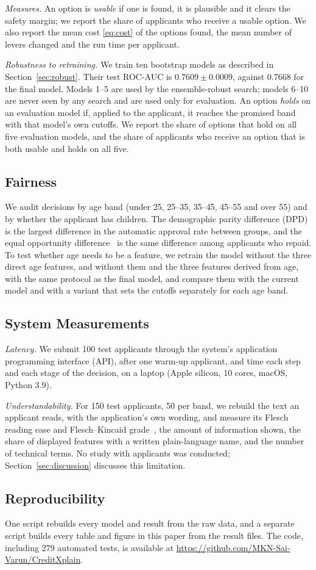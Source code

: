 \emph{Measures.} An option is \emph{usable} if one is found, it is plausible and it clears the safety margin; we report
the share of applicants who receive a usable option. We also report the mean cost \eqref{eq:cost} of the options found,
the mean number of levers changed and the run time per applicant.

\emph{Robustness to retraining.} We train ten bootstrap models as described in Section~\ref{sec:robust}. Their test
ROC-AUC is $0.7609 \pm 0.0009$, against 0.7668 for the final model. Models 1--5 are used by the ensemble-robust search;
models 6--10 are never seen by any search and are used only for evaluation. An option \emph{holds} on an evaluation
model if, applied to the applicant, it reaches the promised band with that model's own cutoffs. We report the share of
options that hold on all five evaluation models, and the share of applicants who receive an option that is both usable
and holds on all five.

\subsection{Fairness}
We audit decisions by age band (under 25, 25--35, 35--45, 45--55 and over 55) and by whether the applicant has
children. The demographic parity difference (DPD) is the largest difference in the automatic approval rate between groups,
and the equal opportunity difference~\cite{hardt2016equality} is the same difference among applicants who repaid. To
test whether age needs to be a feature, we retrain the model without the three direct age features, and without them
and the three features derived from age, with the same protocol as the final model, and compare them with the current
model and with a variant that sets the cutoffs separately for each age band.

\subsection{System Measurements}
\emph{Latency.} We submit 100 test applicants through the system's application programming interface (API), after one warm-up applicant, and time
each step and each stage of the decision, on a laptop (Apple silicon, 10 cores, macOS, Python 3.9).

\emph{Understandability.} For 150 test applicants, 50 per band, we rebuild the text an applicant reads, with the
application's own wording, and measure its Flesch reading ease and Flesch--Kincaid grade~\cite{flesch1948readability},
the amount of information shown, the share of displayed features with a written plain-language name, and the number of
technical terms. No study with applicants was conducted; Section~\ref{sec:discussion} discusses this limitation.

\subsection{Reproducibility}
One script rebuilds every model and result from the raw data, and a separate script builds every table and figure in
this paper from the result files. The code, including 279 automated tests, is available at
\url{https://github.com/MKN-Sai-Varun/CreditXplain}.
